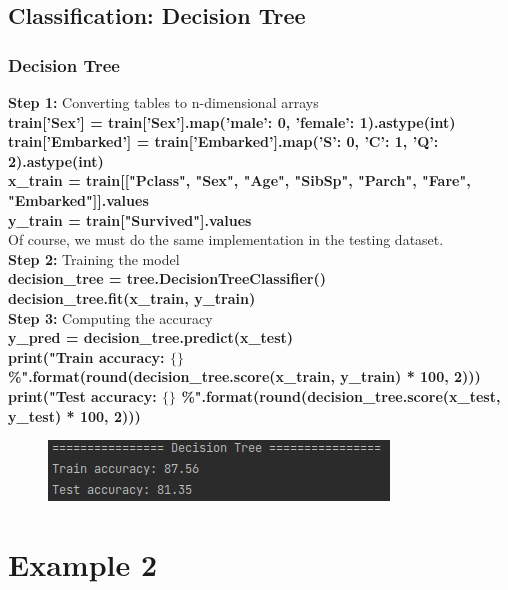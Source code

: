 \documentclass{beamer}
\begin{document}
\subsection{Classification: Decision Tree}
\begin{frame}
	\frametitle{Decision Tree}
	\begin{flushleft}
		\textbf{Step 1:} Converting tables to n-dimensional arrays \\
		\textbf{\color{blue} \scriptsize
			train['Sex'] = train['Sex'].map({'male': 0, 'female': 1}).astype(int) \\
			train['Embarked'] = train['Embarked'].map({'S': 0, 'C': 1, 'Q': 2}).astype(int) \\
			x\_train = train[["Pclass", "Sex", "Age", "SibSp", "Parch", "Fare", "Embarked"]].values \\
			y\_train = train["Survived"].values \\
		}
		Of course, we must do the same implementation in the testing dataset. \\
		\textbf{Step 2:} Training the model \\
		\textbf{\color{blue} \scriptsize
			decision\_tree = tree.DecisionTreeClassifier() \\
			decision\_tree.fit(x\_train, y\_train) \\
		}
		\textbf{Step 3:} Computing the accuracy \\
		\textbf{\color{blue} \scriptsize
			y\_pred = decision\_tree.predict(x\_test) \\
			print("Train accuracy: $\{\}$ \%".format(round(decision\_tree.score(x\_train, y\_train) * 100, 2))) \\
			print("Test accuracy: $\{\}$ \%".format(round(decision\_tree.score(x\_test, y\_test) * 100, 2)))
		}
	\end{flushleft}
	\begin{center}
		\begin{figure}
	    \includegraphics[width=0.5\linewidth]{./src/figures/7.png}
	  \end{figure}
	\end{center}
\end{frame}


\section{Example 2}
\end{document}
